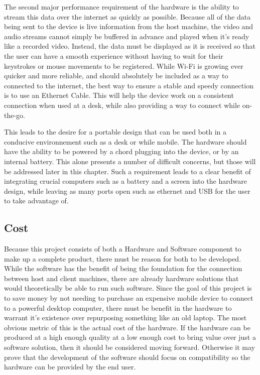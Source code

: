 The second major performance requirement of the hardware is the ability to stream this data over the internet as quickly as possible.
Because all of the data being sent to the device is live information from the host machine, the video and audio streams cannot simply be buffered in advance and played when it's ready like a recorded video.
Instead, the data must be displayed as it is received so that the user can have a smooth experience without having to wait for their keystrokes or mouse movements to be registered.
While Wi-Fi is growing ever quicker and more reliable, and should absolutely be included as a way to connected to the internet, the best way to ensure a stable and speedy connection is to use an Ethernet Cable.
This will help the device work on a consistent connection when used at a desk, while also providing a way to connect while on-the-go.

This leads to the desire for a portable design that can be used both in a conducive environnement such as a desk or while mobile.
The hardware should have the ability to be powered by a chord plugging into the device, or by an internal battery.
This alone presents a number of difficult concerns, but those will be addressed later in this chapter.
Such a requirement leads to a clear benefit of integrating crucial computers such as a battery and a screen into the hardware design, while leaving as many ports open such as ethernet and USB for the user to take advantage of.


\subsection{Cost}\label{sec:HardwareCost}

Because this project consists of both a Hardware and Software component to make up a complete product, there must be reason for both to be developed.
While the software has the benefit of being the foundation for the connection between host and client machines, there are already hardware solutions that would theoretically be able to run such software.
Since the goal of this project is to save money by not needing to purchase an expensive mobile device to connect to a powerful desktop computer, there must be benefit in the hardware to warrant it's existence over repurposing something like an old laptop.
The most obvious metric of this is the actual cost of the hardware.
If the hardware can be produced at a high enough quality at a low enough cost to bring value over just a software solution, then it should be considered moving forward.
Otherwise it may prove that the development of the software should focus on compatibility so the hardware can be provided by the end user.


